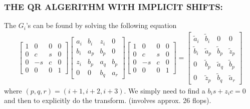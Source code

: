 \documentclass[a4paper,8pt]{beamer} %
\newcommand{\smatrix}[1]{\left[\begin{matrix} #1 \end{matrix}\right]}
\begin{document}
\begin{frame} \frametitle{THE QR ALGERITHM WITH IMPLICIT SHIFTS:} %
The $G_i$'s can be found by solving the following equation
\begin{align}
\smatrix{
1 & 0 & 0 & 0 \\
0 & c & s & 0 \\
0 & -s & c & 0 \\
0 & 0 & 0 & 1 
}
\smatrix{
a_i& b_i & z_i & 0 \\
b_i & a_p & b_p & 0 \\
z_i & b_p & a_q & b_p \\
0 & 0 & b_q & a_r 
}
\smatrix{
1 & 0 & 0 & 0 \\
0 & c & s & 0 \\
0 & -s & c & 0 \\
0 & 0 & 0 & 1 
}
=
\smatrix{
\tilde a_i& \tilde b_i & 0 & 0 \\
\tilde b_i &\tilde a_p &\tilde b_p &\tilde z_p \\
0 &\tilde b_p &\tilde a_q &\tilde b_p \\
0 &\tilde z_p &\tilde b_q &\tilde a_r 
}
\end{align}
where $(p,q,r)=(i+1, i+2, i+3)$. We simply need to find a $b_is+z_ic = 0$
and then to explicitly do the transform. (involves approx. 26 flops).
\end{frame}%
\end{document}

